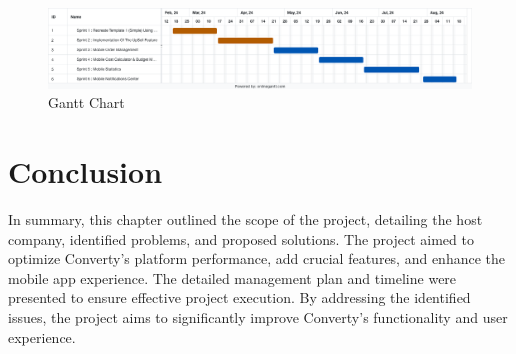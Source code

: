 \begin{figure}[h]
  \centering
  \includegraphics[width=1\textwidth]{Images/Online Gantt 20240715.png}
  \caption{Gantt Chart}
  \label{fig:Gantt Chart}
\end{figure}

\section{Conclusion}
In summary, this chapter outlined the scope of the project, detailing the host company, identified problems, and proposed solutions. The project aimed to optimize Converty's platform performance, add crucial features, and enhance the mobile app experience. The detailed management plan and timeline were presented to ensure effective project execution. By addressing the identified issues, the project aims to significantly improve Converty's functionality and user experience.
